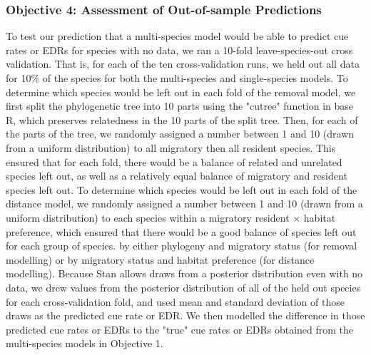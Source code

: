\documentclass[12pt]{article}
\begin{document}
\subsubsection{Objective 4: Assessment of Out-of-sample Predictions}
\par To test our prediction that a multi-species model would be able to predict cue rates or EDRs for species with no data, we ran a 10-fold leave-species-out cross validation.
That is, for each of the ten cross-validation runs, we held out all data for 10\% of the species for both the multi-species and single-species models.
To determine which species would be left out in each fold of the removal model, we first split the phylogenetic tree into 10 parts using the "cutree" function in base R, which preserves relatedness in the 10 parts of the split tree.
Then, for each of the parts of the tree, we randomly assigned a number between 1 and 10 (drawn from a uniform distribution) to all migratory then all resident species.
This ensured that for each fold, there would be a balance of related and unrelated species left out, as well as a relatively equal balance of migratory and resident species left out.
To determine which species would be left out in each fold of the distance model, we randomly assigned a number between 1 and 10 (drawn from a uniform distribution) to each species within a migratory resident $\times$ habitat preference, which ensured that there would be a good balance of species left out for each group of species.
by either phylogeny and migratory status (for removal modelling) or by migratory status and habitat preference (for distance modelling).
Because Stan allows draws from a posterior distribution even with no data, we drew values from the posterior distribution of all of the held out species for each cross-validation fold, and used mean and standard deviation of those draws as the predicted cue rate or EDR.
We then modelled the difference in those predicted cue rates or EDRs to the "true" cue rates or EDRs obtained from the multi-species models in Objective 1.
\end{document}
